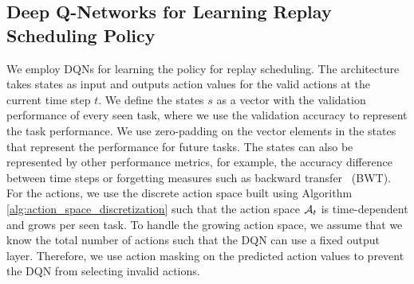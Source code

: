 \subsection{Deep Q-Networks for Learning Replay Scheduling Policy}

We employ DQNs for learning the policy for replay scheduling. The architecture takes states as input and outputs action values for the valid actions at the current time step $t$. We define the states $s$ as a vector with the validation performance of every seen task, where we use the validation accuracy to represent the task performance. We use zero-padding on the vector elements in the states that represent the performance for future tasks. The states can also be represented by other performance metrics, for example, the accuracy difference between time steps or forgetting measures such as backward transfer~\cite{lopez2017gradient} (BWT). For the actions, we use the discrete action space built using Algorithm \ref{alg:action_space_discretization} such that the action space ${\mathcal{A}}_t$ is time-dependent and grows per seen task. To handle the growing action space, we assume that we know the total number of actions such that the DQN can use a fixed output layer. Therefore, we use action masking on the predicted action values to prevent the DQN from selecting invalid actions. 

